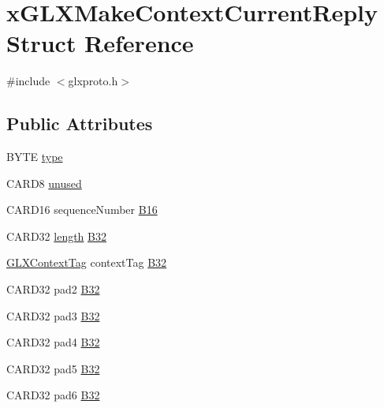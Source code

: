 \hypertarget{structx_g_l_x_make_context_current_reply}{}\section{x\+G\+L\+X\+Make\+Context\+Current\+Reply Struct Reference}
\label{structx_g_l_x_make_context_current_reply}


{\ttfamily \#include $<$glxproto.\+h$>$}

\subsection*{Public Attributes}
\begin{DoxyCompactItemize}
\item 
B\+Y\+TE \hyperlink{structx_g_l_x_make_context_current_reply_a092a4e27b97c0cece01265eda9655273}{type}
\item 
C\+A\+R\+D8 \hyperlink{structx_g_l_x_make_context_current_reply_a906fe776904fe6f9c8c7d19c7cece0a9}{unused}
\item 
C\+A\+R\+D16 sequence\+Number \hyperlink{structx_g_l_x_make_context_current_reply_a530b11aeb03e9240d38d42421177d1cc}{B16}
\item 
C\+A\+R\+D32 \hyperlink{glcorearb_8h_ab9c919755bde3b34349e23a32b4e0fa7}{length} \hyperlink{structx_g_l_x_make_context_current_reply_a6f102d36861b8186f6836e25a4fb1f41}{B32}
\item 
\hyperlink{glxproto_8h_ae71763ce00c9fa460beb4699af678691}{G\+L\+X\+Context\+Tag} context\+Tag \hyperlink{structx_g_l_x_make_context_current_reply_a9c2bc59b78618857a37aa291d928f802}{B32}
\item 
C\+A\+R\+D32 pad2 \hyperlink{structx_g_l_x_make_context_current_reply_a9865ab536fe0b165facbda68847c267f}{B32}
\item 
C\+A\+R\+D32 pad3 \hyperlink{structx_g_l_x_make_context_current_reply_a9b564261562af88c097d939b158f5a9f}{B32}
\item 
C\+A\+R\+D32 pad4 \hyperlink{structx_g_l_x_make_context_current_reply_a7308f575998cf371a41fef3dd1c1e5fe}{B32}
\item 
C\+A\+R\+D32 pad5 \hyperlink{structx_g_l_x_make_context_current_reply_ab2ef9bd987951c205216bf98ff968c56}{B32}
\item 
C\+A\+R\+D32 pad6 \hyperlink{structx_g_l_x_make_context_current_reply_a479474310afd844846c39d81e63c3bcd}{B32}
\end{DoxyCompactItemize}


